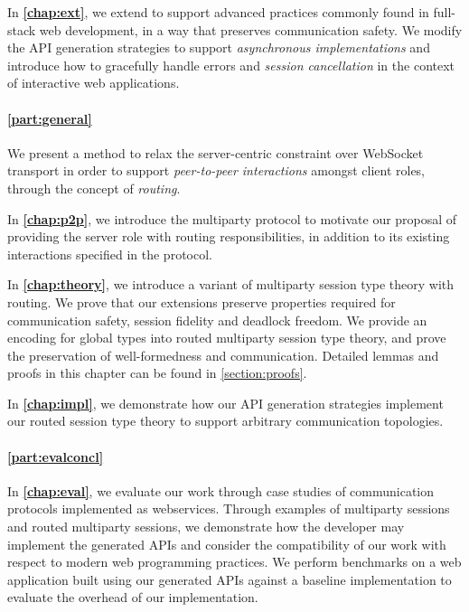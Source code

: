 In \textbf{\cref{chap:ext}},
we extend \codegen to support advanced
practices commonly found in full-stack web development,
in a way that
preserves communication safety. 
We modify the API generation strategies
to support \textit{asynchronous implementations} 
and introduce how to 
gracefully handle errors and \textit{session cancellation} 
in the context of interactive web applications.

\paragraph{\cref{part:general}} 
We present a method to relax the server-centric constraint over WebSocket
transport in order to support \textit{peer-to-peer interactions} 
amongst 
client roles, through the concept of \emph{routing}.

In \textbf{\cref{chap:p2p}}, 
we introduce the  multiparty
protocol to motivate our proposal of providing the server role with 
routing responsibilities, in addition to its existing interactions
specified in the protocol.

In \textbf{\cref{chap:theory}}, 
we introduce a variant of multiparty 
session type theory with routing. We prove that our extensions preserve 
properties required for communication safety, 
session fidelity and deadlock freedom.
We provide an encoding for global types into routed multiparty 
session type theory, and prove the preservation of well-formedness
and communication. Detailed lemmas and proofs in this chapter can
be found in \cref{section:proofs}.

In \textbf{\cref{chap:impl}}, 
we demonstrate how our API generation strategies
implement our routed session type theory to support arbitrary communication
topologies.

\paragraph{\cref{part:evalconcl}}
In \textbf{\cref{chap:eval}}, 
we evaluate our work through 
case studies of communication protocols 
implemented as webservices. Through examples of
multiparty sessions and routed multiparty sessions, 
we demonstrate how the
developer may implement the generated APIs and 
consider the compatibility of our work with respect to
modern web programming practices.
We perform benchmarks on a web application built using our
generated APIs against a baseline implementation to evaluate
the overhead of our implementation.

